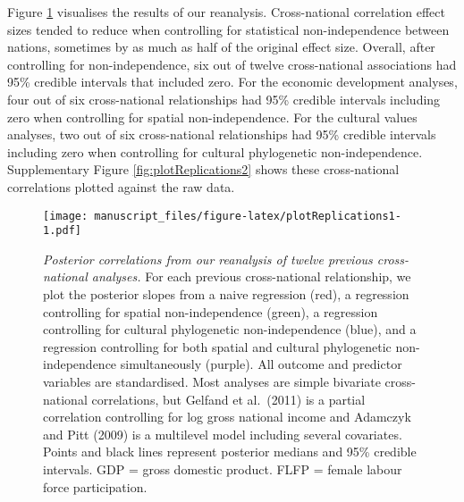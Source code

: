 \documentclass[
  man,floatsintext]{apa6}
\begin{document}
Figure \ref{fig:plotReplications1} visualises the results of our reanalysis. Cross-national correlation effect sizes tended to reduce when controlling for statistical non-independence between nations, sometimes by as much as half of the original effect size. Overall, after controlling for non-independence, six out of twelve cross-national associations had 95\% credible intervals that included zero. For the economic development analyses, four out of six cross-national relationships had 95\% credible intervals including zero when controlling for spatial non-independence. For the cultural values analyses, two out of six cross-national relationships had 95\% credible intervals including zero when controlling for cultural phylogenetic non-independence. Supplementary Figure \ref{fig:plotReplications2} shows these cross-national correlations plotted against the raw data.



\begin{figure}
\centering
\texttt{[image: manuscript\_files/figure-latex/plotReplications1-1.pdf]}
\caption{\label{fig:plotReplications1}\emph{Posterior correlations from our reanalysis of twelve previous cross-national analyses.} For each previous cross-national relationship, we plot the posterior slopes from a naive regression (red), a regression controlling for spatial non-independence (green), a regression controlling for cultural phylogenetic non-independence (blue), and a regression controlling for both spatial and cultural phylogenetic non-independence simultaneously (purple). All outcome and predictor variables are standardised. Most analyses are simple bivariate cross-national correlations, but Gelfand et al.~(2011) is a partial correlation controlling for log gross national income and Adamczyk and Pitt (2009) is a multilevel model including several covariates. Points and black lines represent posterior medians and 95\% credible intervals. GDP = gross domestic product. FLFP = female labour force participation.}
\end{figure}
\end{document}

